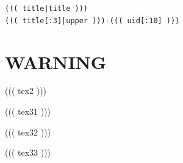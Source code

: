 \documentclass{article}
\begin{document}
\vspace{15pt}

\begin{flushright}
\scriptsize{
  \texttt{((( title|title ))) \\ ((( title[:3]|upper )))-((( uid[:10] )))}
}
\end{flushright}

\clearpage


\section*{WARNING}

((( tex2 )))

\vspace{12pt}

((( tex31 )))

((( tex32 )))

((( tex33 )))

\clearpage

\end{document}
